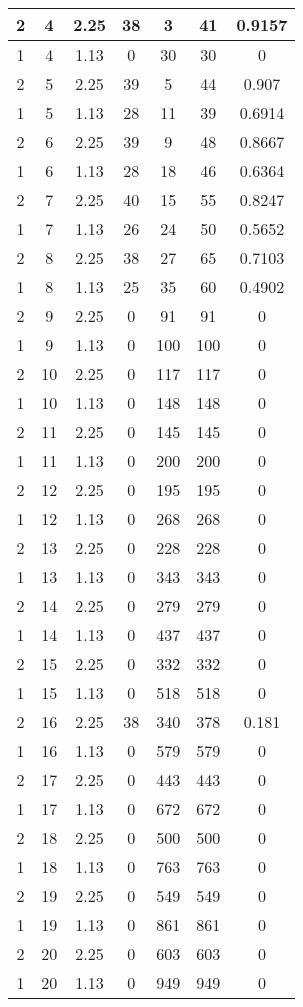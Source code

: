 \documentclass[letterpaper, 12pt]{article}
\begin{document}
\begin{longtable}{|c|c|c|c|c|c|c|}
\hline
2 & 4 & 2.25 & 38 & 3 & 41 & 0.9157 \\
\hline
1 & 4 & 1.13 & 0 & 30 & 30 & 0 \\
\hline
2 & 5 & 2.25 & 39 & 5 & 44 & 0.907 \\
\hline
1 & 5 & 1.13 & 28 & 11 & 39 & 0.6914 \\
\hline
2 & 6 & 2.25 & 39 & 9 & 48 & 0.8667 \\
\hline
1 & 6 & 1.13 & 28 & 18 & 46 & 0.6364 \\
\hline
2 & 7 & 2.25 & 40 & 15 & 55 & 0.8247 \\
\hline
1 & 7 & 1.13 & 26 & 24 & 50 & 0.5652 \\
\hline
2 & 8 & 2.25 & 38 & 27 & 65 & 0.7103 \\
\hline
1 & 8 & 1.13 & 25 & 35 & 60 & 0.4902 \\
\hline
2 & 9 & 2.25 & 0 & 91 & 91 & 0 \\
\hline
1 & 9 & 1.13 & 0 & 100 & 100 & 0 \\
\hline
2 & 10 & 2.25 & 0 & 117 & 117 & 0 \\
\hline
1 & 10 & 1.13 & 0 & 148 & 148 & 0 \\
\hline
2 & 11 & 2.25 & 0 & 145 & 145 & 0 \\
\hline
1 & 11 & 1.13 & 0 & 200 & 200 & 0 \\
\hline
2 & 12 & 2.25 & 0 & 195 & 195 & 0 \\
\hline
1 & 12 & 1.13 & 0 & 268 & 268 & 0 \\
\hline
2 & 13 & 2.25 & 0 & 228 & 228 & 0 \\
\hline
1 & 13 & 1.13 & 0 & 343 & 343 & 0 \\
\hline
2 & 14 & 2.25 & 0 & 279 & 279 & 0 \\
\hline
1 & 14 & 1.13 & 0 & 437 & 437 & 0 \\
\hline
2 & 15 & 2.25 & 0 & 332 & 332 & 0 \\
\hline
1 & 15 & 1.13 & 0 & 518 & 518 & 0 \\
\hline
2 & 16 & 2.25 & 38 & 340 & 378 & 0.181 \\
\hline
1 & 16 & 1.13 & 0 & 579 & 579 & 0 \\
\hline
2 & 17 & 2.25 & 0 & 443 & 443 & 0 \\
\hline
1 & 17 & 1.13 & 0 & 672 & 672 & 0 \\
\hline
2 & 18 & 2.25 & 0 & 500 & 500 & 0 \\
\hline
1 & 18 & 1.13 & 0 & 763 & 763 & 0 \\
\hline
2 & 19 & 2.25 & 0 & 549 & 549 & 0 \\
\hline
1 & 19 & 1.13 & 0 & 861 & 861 & 0 \\
\hline
2 & 20 & 2.25 & 0 & 603 & 603 & 0 \\
\hline
1 & 20 & 1.13 & 0 & 949 & 949 & 0 \\
\hline
\end{longtable}
\end{document}
